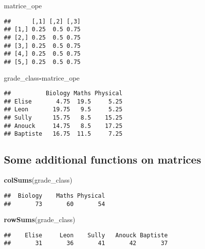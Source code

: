 \documentclass[
]{article}
\newenvironment{Shaded}{\begin{snugshade}}{\end{snugshade}}
\newcommand{\FunctionTok}[1]{\textcolor[rgb]{0.13,0.29,0.53}{\textbf{#1}}}
\newcommand{\NormalTok}[1]{#1}
\newcommand{\SpecialCharTok}[1]{\textcolor[rgb]{0.81,0.36,0.00}{\textbf{#1}}}
\begin{document}
\begin{Shaded}
\begin{Highlighting}[]
\NormalTok{matrice\_ope}
\end{Highlighting}
\end{Shaded}

\begin{verbatim}
##      [,1] [,2] [,3]
## [1,] 0.25  0.5 0.75
## [2,] 0.25  0.5 0.75
## [3,] 0.25  0.5 0.75
## [4,] 0.25  0.5 0.75
## [5,] 0.25  0.5 0.75
\end{verbatim}

\begin{Shaded}
\begin{Highlighting}[]
\NormalTok{grade\_class}\SpecialCharTok{{-}}\NormalTok{matrice\_ope}
\end{Highlighting}
\end{Shaded}

\begin{verbatim}
##          Biology Maths Physical
## Elise       4.75  19.5     5.25
## Leon       19.75   9.5     5.25
## Sully      15.75   8.5    15.25
## Anouck     14.75   8.5    17.25
## Baptiste   16.75  11.5     7.25
\end{verbatim}

\hypertarget{some-additional-functions-on-matrices}{%
\subsection{Some additional functions on
matrices}\label{some-additional-functions-on-matrices}}

\begin{Shaded}
\begin{Highlighting}[]
\FunctionTok{colSums}\NormalTok{(grade\_class)}
\end{Highlighting}
\end{Shaded}

\begin{verbatim}
##  Biology    Maths Physical 
##       73       60       54
\end{verbatim}

\begin{Shaded}
\begin{Highlighting}[]
\FunctionTok{rowSums}\NormalTok{(grade\_class)}
\end{Highlighting}
\end{Shaded}

\begin{verbatim}
##    Elise     Leon    Sully   Anouck Baptiste 
##       31       36       41       42       37
\end{verbatim}
\end{document}
